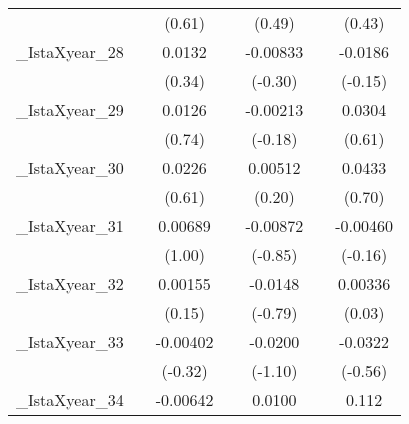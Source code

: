 {\begin{tabular}{l*{6}{c}}
            &                     &      (0.61)         &                     &      (0.49)         &                     &      (0.43)         \\
[1em]
\_IstaXyear\_28&                     &      0.0132         &                     &    -0.00833         &                     &     -0.0186         \\
            &                     &      (0.34)         &                     &     (-0.30)         &                     &     (-0.15)         \\
[1em]
\_IstaXyear\_29&                     &      0.0126         &                     &    -0.00213         &                     &      0.0304         \\
            &                     &      (0.74)         &                     &     (-0.18)         &                     &      (0.61)         \\
[1em]
\_IstaXyear\_30&                     &      0.0226         &                     &     0.00512         &                     &      0.0433         \\
            &                     &      (0.61)         &                     &      (0.20)         &                     &      (0.70)         \\
[1em]
\_IstaXyear\_31&                     &     0.00689         &                     &    -0.00872         &                     &    -0.00460         \\
            &                     &      (1.00)         &                     &     (-0.85)         &                     &     (-0.16)         \\
[1em]
\_IstaXyear\_32&                     &     0.00155         &                     &     -0.0148         &                     &     0.00336         \\
            &                     &      (0.15)         &                     &     (-0.79)         &                     &      (0.03)         \\
[1em]
\_IstaXyear\_33&                     &    -0.00402         &                     &     -0.0200         &                     &     -0.0322         \\
            &                     &     (-0.32)         &                     &     (-1.10)         &                     &     (-0.56)         \\
[1em]
\_IstaXyear\_34&                     &    -0.00642         &                     &      0.0100         &                     &       0.112         \\

\end{tabular}}
